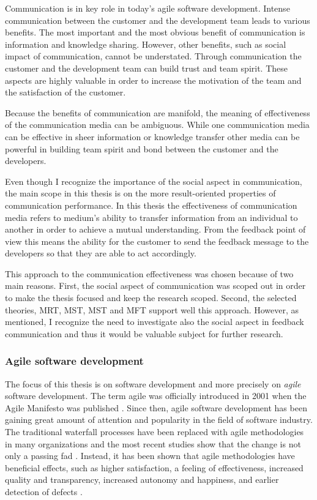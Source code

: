 \documentclass[english,12pt,a4paper,pdftex]{article}
\begin{document}
Communication is in key role in today's agile software development. Intense communication between the customer and the development team leads to various benefits. The most important and the most obvious benefit of communication is information and knowledge sharing. However, other benefits, such as social impact of communication, cannot be understated. Through communication the customer and the development team can build trust and team spirit. These aspects are highly valuable in order to increase the motivation of the team and the satisfaction of the customer.

Because the benefits of communication are manifold, the meaning of effectiveness of the communication media can be ambiguous. While one communication media can be effective in sheer information or knowledge transfer other media can be powerful in building team spirit and bond between the customer and the developers.

Even though I recognize the importance of the social aspect in communication, the main scope in this thesis is on the more result-oriented properties of communication performance. In this thesis the effectiveness of communication media refers to medium's ability to transfer information from an individual to another in order to achieve a mutual understanding. From the feedback point of view this means the ability for the customer to send the feedback message to the developers so that they are able to act accordingly.

This approach to the communication effectiveness was chosen because of two main reasons. First, the social aspect of communication was scoped out in order to make the thesis focused and keep the research scoped. Second, the selected theories, \ac{MRT}, \ac{MST}, \ac{MST} and \ac{MFT} support well this approach. However, as mentioned, I recognize the need to investigate also the social aspect in feedback communication and thus it would be valuable subject for further research.

\subsubsection{Agile software development}

The focus of this thesis is on software development and more precisely on \emph{agile} software development. The term agile was officially introduced in 2001 when the Agile Manifesto was published \citep{agilemanifesto}. Since then, agile software development has been gaining great amount of attention and popularity in the field of software industry. The traditional waterfall processes have been replaced with agile methodologies in many organizations and the most recent studies show that the change is not only a passing fad \citep{laanti2011}. Instead, it has been shown that agile methodologies have beneficial effects, such as higher satisfaction, a feeling of effectiveness, increased quality and transparency, increased autonomy and happiness, and earlier detection of defects \citep{korhonen2012}.
\end{document}
